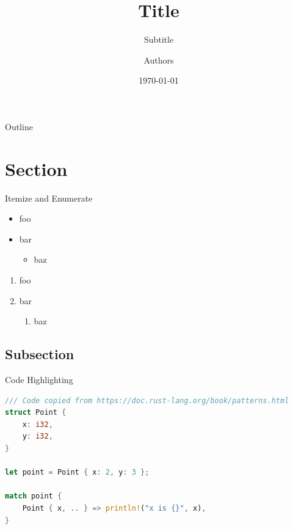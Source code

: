 \documentclass[11pt,aspectratio=169]{beamer}
\title[Title at bottom]{Title}
\subtitle{Subtitle}
\author[Authors at bottom]{Authors}
\date[\today]{\today}
\begin{document}

\begin{frame}[plain]
  \titlepage
\end{frame}

\begin{frame}{Outline}
\tableofcontents
\end{frame}

\section{Section}


\begin{frame}{Itemize and Enumerate}
    \begin{itemize}
      \item foo
      \item bar
        \begin{itemize}
          \item baz
        \end{itemize}
    \end{itemize}
    \begin{enumerate}
      \item foo
      \item bar
        \begin{enumerate}
          \item baz
        \end{enumerate}
    \end{enumerate}
\end{frame}

\subsection{Subsection}
\begin{frame}[fragile]{Code Highlighting}
  \begin{lstlisting}[language=Rust]
/// Code copied from https://doc.rust-lang.org/book/patterns.html
struct Point {
    x: i32,
    y: i32,
}

let point = Point { x: 2, y: 3 };

match point {
    Point { x, .. } => println!("x is {}", x),
}
  \end{lstlisting}
\end{frame}
\end{document}
